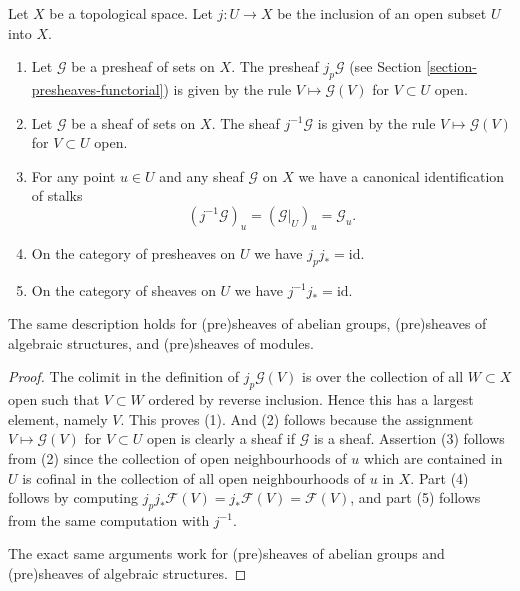 \begin{lemma}
\label{lemma-j-pullback}
Let $X$ be a topological space.
Let $j : U \to X$ be the inclusion of an open subset $U$ into $X$.
\begin{enumerate}
\item Let $\mathcal{G}$ be a presheaf of sets on $X$.
The presheaf $j_p\mathcal{G}$
(see Section \ref{section-presheaves-functorial}) is given by the rule
$V \mapsto \mathcal{G}(V)$ for $V \subset U$ open.
\item Let $\mathcal{G}$ be a sheaf of sets on $X$.
The sheaf $j^{-1}\mathcal{G}$ is given by the rule
$V \mapsto \mathcal{G}(V)$ for $V \subset U$ open.
\item For any point $u \in U$ and any sheaf $\mathcal{G}$ on $X$
we have a canonical identification of stalks
$$
(j^{-1}\mathcal{G})_u = (\mathcal{G}|_U)_u = \mathcal{G}_u.
$$
\item On the category of presheaves on $U$ we have $j_pj_* = \text{id}$.
\item On the category of sheaves on $U$ we have $j^{-1}j_* = \text{id}$.
\end{enumerate}
The same description holds for (pre)sheaves of abelian groups,
(pre)sheaves of algebraic structures, and (pre)sheaves of modules.
\end{lemma}

\begin{proof}
The colimit in the definition of $j_p\mathcal{G}(V)$
is over the collection of all $W \subset X$ open such that $V \subset W$
ordered by reverse inclusion.
Hence this has a largest element, namely $V$. This proves (1).
And (2) follows because the assignment $V \mapsto \mathcal{G}(V)$
for $V \subset U$ open is clearly a sheaf if $\mathcal{G}$ is a
sheaf. Assertion (3) follows from (2) since the collection
of open neighbourhoods of $u$ which are contained in $U$ is cofinal
in the collection of all open neighbourhoods of $u$ in $X$.
Part (4) follows by computing
$j_pj_*\mathcal{F}(V) = j_*\mathcal{F}(V) = \mathcal{F}(V)$,
and part (5) follows from the same computation with $j^{-1}$.

\medskip\noindent
The exact same arguments work for (pre)sheaves of abelian groups
and (pre)sheaves of algebraic structures.
\end{proof}


